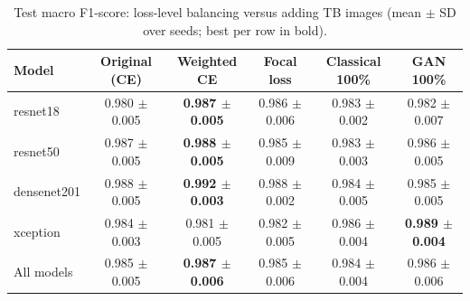 \begin{table}[htbp]
\centering
\caption{Test macro F1-score: loss-level balancing versus adding TB images (mean $\pm$ SD over seeds; best per row in bold).}
\label{tab:loss_macro_f1}
\begin{tabular}{lccccc}
\toprule
Model & Original (CE) & Weighted CE & Focal loss & Classical 100\% & GAN 100\% \\
\midrule
resnet18 & 0.980 $\pm$ 0.005 & \textbf{0.987 $\pm$ 0.005} & 0.986 $\pm$ 0.006 & 0.983 $\pm$ 0.002 & 0.982 $\pm$ 0.007 \\
resnet50 & 0.987 $\pm$ 0.005 & \textbf{0.988 $\pm$ 0.005} & 0.985 $\pm$ 0.009 & 0.983 $\pm$ 0.003 & 0.986 $\pm$ 0.005 \\
densenet201 & 0.988 $\pm$ 0.005 & \textbf{0.992 $\pm$ 0.003} & 0.988 $\pm$ 0.002 & 0.984 $\pm$ 0.005 & 0.985 $\pm$ 0.005 \\
xception & 0.984 $\pm$ 0.003 & 0.981 $\pm$ 0.005 & 0.982 $\pm$ 0.005 & 0.986 $\pm$ 0.004 & \textbf{0.989 $\pm$ 0.004} \\
\midrule
All models & 0.985 $\pm$ 0.005 & \textbf{0.987 $\pm$ 0.006} & 0.985 $\pm$ 0.006 & 0.984 $\pm$ 0.004 & 0.986 $\pm$ 0.006 \\
\bottomrule
\end{tabular}
\end{table}